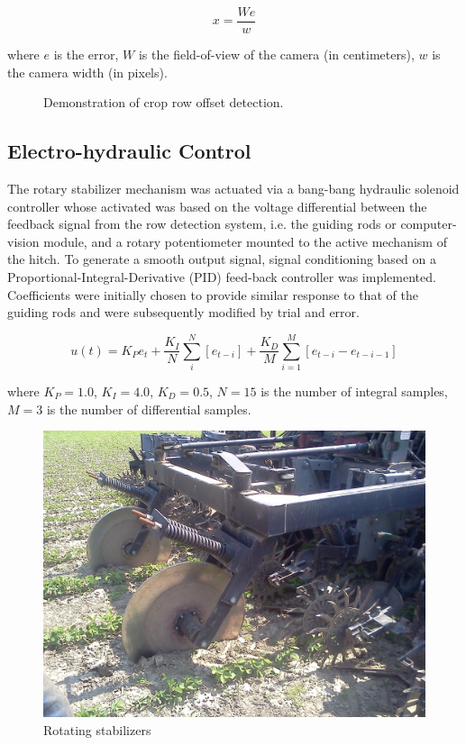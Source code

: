 \documentclass[authoryear]{elsarticle}
\begin{document}
\begin{equation}
  x = \frac{We}{w}
  \label{eq:px2mm}
\end{equation}
\begin{flushleft}
where $e$ is the error, $W$ is the field-of-view of the camera (in
centimeters), $w$ is the camera width (in pixels).
\end{flushleft}

\begin{figure}
  \centering
  \caption{Demonstration of crop row offset detection.}
  \label{fig:row_estimation}
\end{figure}

\subsection{Electro-hydraulic Control}
The rotary stabilizer mechanism was actuated via a bang-bang hydraulic
solenoid controller whose activated was based on the voltage
differential between the feedback signal from the row detection
system, i.e. the guiding rods or computer-vision module, and a
rotary potentiometer mounted to the active mechanism of the hitch. 
To generate a smooth output signal, signal conditioning based on a
Proportional-Integral-Derivative (PID) feed-back controller was
implemented. Coefficients were initially chosen to provide similar
response to that of the guiding rods and were subsequently modified by
trial and error.

\begin{equation}
    u(t) = K_{P}e_{t} + \frac{K_{I}}{N}\displaystyle\sum_i^N \left[
      e_{t-i} \right] +
    \frac{K_{D}}{M}\displaystyle\sum_{i=1}^M \left[e_{t-i}-e_{t-i-1}\right]
  \label{eq:pid}
\end{equation}
\begin{flushleft}
where $K_{P}=1.0$, $K_{I}=4.0$, $K_{D}=0.5$, $N=15$ is the number of integral samples,
$M=3$ is the number of differential samples.
\end{flushleft}

\begin{figure}
  \centering
  \includegraphics[scale=0.1,natwidth=610,natheight=642]{stabilizers.jpg}
  \caption{Rotating stabilizers}
  \label{fig:stabilizers}
\end{figure}
\end{document}
